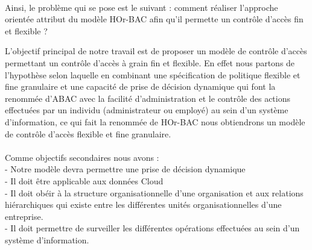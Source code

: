 \paragraph{} Ainsi, le problème qui se pose est le suivant : comment réaliser l'approche orientée attribut du modèle HOr-BAC afin qu'il permette un contrôle d'accès fin et flexible ?



L'objectif principal de notre travail est de proposer un modèle de contrôle d'accès permettant un contrôle d'accès à grain fin et flexible. En effet nous partons de l'hypothèse selon laquelle en combinant une spécification de politique flexible et fine granulaire  et une capacité de prise de décision dynamique  qui font la renommée d'ABAC avec la facilité d'administration et le contrôle des actions effectuées par un individu (administrateur ou employé) au sein d'un système d'information, ce qui fait la renommée de HOr-BAC nous obtiendrons un modèle de contrôle d'accès flexible et fine granulaire.   \paragraph{}Comme objectifs secondaires nous avons :
\\
- Notre modèle devra permettre une prise de décision dynamique  
\\
- Il doit être applicable  aux données Cloud
\\
- Il doit obéir à la structure organisationnelle d'une organisation et aux relations hiérarchiques qui existe entre les différentes unités organisationnelles d'une entreprise.
\\
- Il doit permettre de surveiller les différentes opérations effectuées au sein d'un système d'information.





\myCleanStarChapterEnd
